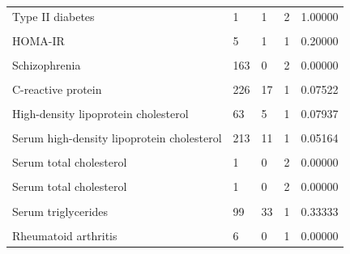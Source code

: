 \documentclass[11pt,twoside]{bristolthesis}
\begin{document}
\begin{table}
{\begin{tabular}[t]{lllll}
Type II diabetes & 1 & 1 & 2 & 1.00000\\
\cellcolor{gray!6}{HOMA-IR} & \cellcolor{gray!6}{1} & \cellcolor{gray!6}{1} & \cellcolor{gray!6}{1} & \cellcolor{gray!6}{1.00000}\\
HOMA-IR & 5 & 1 & 1 & 0.20000\\
\addlinespace
\cellcolor{gray!6}{Schizophrenia} & \cellcolor{gray!6}{3} & \cellcolor{gray!6}{0} & \cellcolor{gray!6}{2} & \cellcolor{gray!6}{0.00000}\\
Schizophrenia & 163 & 0 & 2 & 0.00000\\
\cellcolor{gray!6}{C-reactive protein} & \cellcolor{gray!6}{3} & \cellcolor{gray!6}{3} & \cellcolor{gray!6}{1} & \cellcolor{gray!6}{1.00000}\\
C-reactive protein & 226 & 17 & 1 & 0.07522\\
\cellcolor{gray!6}{High-density lipoprotein cholesterol} & \cellcolor{gray!6}{2} & \cellcolor{gray!6}{2} & \cellcolor{gray!6}{1} & \cellcolor{gray!6}{1.00000}\\
\addlinespace
High-density lipoprotein cholesterol & 63 & 5 & 1 & 0.07937\\
\cellcolor{gray!6}{Serum high-density lipoprotein cholesterol} & \cellcolor{gray!6}{22} & \cellcolor{gray!6}{17} & \cellcolor{gray!6}{1} & \cellcolor{gray!6}{0.77273}\\
Serum high-density lipoprotein cholesterol & 213 & 11 & 1 & 0.05164\\
\cellcolor{gray!6}{Serum low-density lipoprotein cholesterol} & \cellcolor{gray!6}{61} & \cellcolor{gray!6}{0} & \cellcolor{gray!6}{1} & \cellcolor{gray!6}{0.00000}\\
Serum total cholesterol & 1 & 0 & 2 & \vphantom{1}0.00000\\
\addlinespace
\cellcolor{gray!6}{Serum total cholesterol} & \cellcolor{gray!6}{111} & \cellcolor{gray!6}{0} & \cellcolor{gray!6}{2} & \cellcolor{gray!6}{0.00000}\\
Serum total cholesterol & 1 & 0 & 2 & 0.00000\\
\cellcolor{gray!6}{Serum triglycerides} & \cellcolor{gray!6}{46} & \cellcolor{gray!6}{38} & \cellcolor{gray!6}{1} & \cellcolor{gray!6}{0.82609}\\
Serum triglycerides & 99 & 33 & 1 & 0.33333\\
\cellcolor{gray!6}{Rheumatoid arthritis} & \cellcolor{gray!6}{47,875} & \cellcolor{gray!6}{8} & \cellcolor{gray!6}{1} & \cellcolor{gray!6}{0.00017}\\
\addlinespace
Rheumatoid arthritis & 6 & 0 & 1 & 0.00000\\

\end{tabular}}
\end{table}
\end{document}
